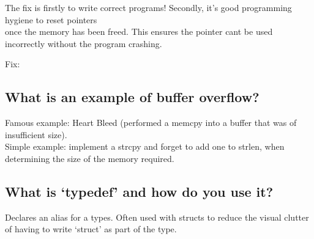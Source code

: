 \begin{Shaded}
\begin{Highlighting}[]
 \NormalTok{(}\NormalTok{));}

\NormalTok{; }

\end{Highlighting}
\end{Shaded}

The fix is firstly to write correct programs! Secondly, it's good
programming hygiene to reset pointers\\once the memory has been freed.
This ensures the pointer cant be used incorrectly without the program
crashing.

Fix:

\begin{Shaded}
\begin{Highlighting}[]
\end{Highlighting}
\end{Shaded}

\subsection{What is an example of buffer
overflow?}\label{what-is-an-example-of-buffer-overflow}

Famous example: Heart Bleed (performed a memcpy into a buffer that was
of insufficient size).\\Simple example: implement a strcpy and forget to
add one to strlen, when determining the size of the memory required.

\subsection{\texorpdfstring{What is `typedef' and how do you use
it?}{What is typedef and how do you use it?}}\label{what-is-typedef-and-how-do-you-use-it}

Declares an alias for a types. Often used with structs to reduce the
visual clutter of having to write `struct' as part of the type.

\begin{Shaded}
\begin{Highlighting}[]
  
\NormalTok{;}

  
\end{Highlighting}
\end{Shaded}

